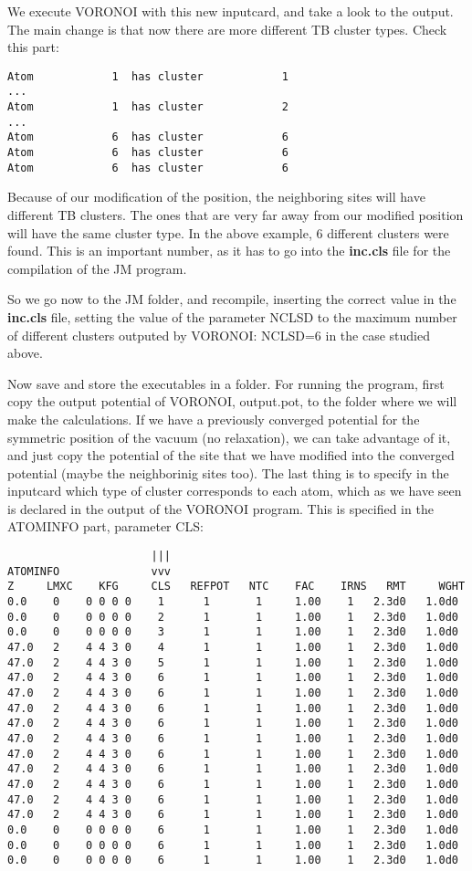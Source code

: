 \documentclass[a4paper,10pt,fullpage]{report}
\begin{document}
We execute VORONOI with this new inputcard, and take a look to the output.
The main change is that now there are more different TB cluster types.
Check this part:
\begin{verbatim}
Atom            1  has cluster            1
...
Atom            1  has cluster            2
...
Atom            6  has cluster            6
Atom            6  has cluster            6
Atom            6  has cluster            6
\end{verbatim}
Because of our modification of the position, the neighboring sites will have different TB
clusters. The ones that are very  far away from our modified position will have the
same cluster type. In the above example, 6 different clusters were found. This is an
important number, as it has to go into the \textbf{inc.cls} file for 
the compilation of the JM program. 

So we go now to the JM folder, and recompile, inserting the correct value in
the \textbf{inc.cls} file, setting the value of the parameter NCLSD to
the maximum number of different clusters outputed by VORONOI: NCLSD=6 in the case
studied above. 

Now save and store the executables in a folder. For running the 
program, first copy the output potential of VORONOI, output.pot,
to the folder where we will make the calculations. If we have a previously converged
potential for the symmetric position of the vacuum (no relaxation),
we can take advantage of it, and just copy the potential of the site that
we have modified into the converged potential (maybe the neighborinig sites too). 
The last thing is to specify in the inputcard which type of cluster corresponds to
each atom, which as we have seen is declared in the output of the VORONOI program.
This is specified in the ATOMINFO part, parameter CLS:
\begin{verbatim}                      |||
ATOMINFO              vvv
Z     LMXC    KFG     CLS   REFPOT   NTC    FAC    IRNS   RMT     WGHT
0.0    0    0 0 0 0    1      1       1     1.00    1   2.3d0   1.0d0
0.0    0    0 0 0 0    2      1       1     1.00    1   2.3d0   1.0d0
0.0    0    0 0 0 0    3      1       1     1.00    1   2.3d0   1.0d0
47.0   2    4 4 3 0    4      1       1     1.00    1   2.3d0   1.0d0
47.0   2    4 4 3 0    5      1       1     1.00    1   2.3d0   1.0d0
47.0   2    4 4 3 0    6      1       1     1.00    1   2.3d0   1.0d0
47.0   2    4 4 3 0    6      1       1     1.00    1   2.3d0   1.0d0
47.0   2    4 4 3 0    6      1       1     1.00    1   2.3d0   1.0d0
47.0   2    4 4 3 0    6      1       1     1.00    1   2.3d0   1.0d0
47.0   2    4 4 3 0    6      1       1     1.00    1   2.3d0   1.0d0
47.0   2    4 4 3 0    6      1       1     1.00    1   2.3d0   1.0d0
47.0   2    4 4 3 0    6      1       1     1.00    1   2.3d0   1.0d0
47.0   2    4 4 3 0    6      1       1     1.00    1   2.3d0   1.0d0
47.0   2    4 4 3 0    6      1       1     1.00    1   2.3d0   1.0d0
47.0   2    4 4 3 0    6      1       1     1.00    1   2.3d0   1.0d0
0.0    0    0 0 0 0    6      1       1     1.00    1   2.3d0   1.0d0
0.0    0    0 0 0 0    6      1       1     1.00    1   2.3d0   1.0d0
0.0    0    0 0 0 0    6      1       1     1.00    1   2.3d0   1.0d0
\end{verbatim}
\end{document}
